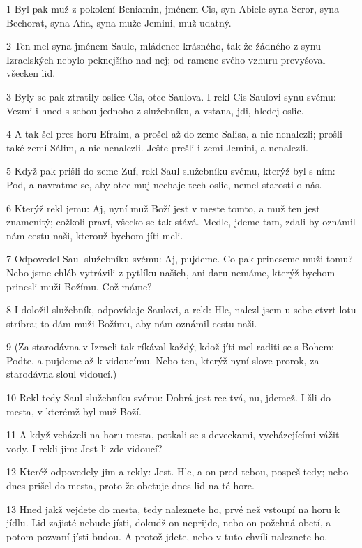 \par 1 Byl pak muž z pokolení Beniamin, jménem Cis, syn Abiele syna Seror, syna Bechorat, syna Afia, syna muže Jemini, muž udatný.
\par 2 Ten mel syna jménem Saule, mládence krásného, tak že žádného z synu Izraelských nebylo peknejšího nad nej; od ramene svého vzhuru prevyšoval všecken lid.
\par 3 Byly se pak ztratily oslice Cis, otce Saulova. I rekl Cis Saulovi synu svému: Vezmi i hned s sebou jednoho z služebníku, a vstana, jdi, hledej oslic.
\par 4 A tak šel pres horu Efraim, a prošel až do zeme Salisa, a nic nenalezli; prošli také zemi Sálim, a nic nenalezli. Ješte prešli i zemi Jemini, a nenalezli.
\par 5 Když pak prišli do zeme Zuf, rekl Saul služebníku svému, kterýž byl s ním: Pod, a navratme se, aby otec muj nechaje tech oslic, nemel starosti o nás.
\par 6 Kterýž rekl jemu: Aj, nyní muž Boží jest v meste tomto, a muž ten jest znamenitý; cožkoli praví, všecko se tak stává. Medle, jdeme tam, zdali by oznámil nám cestu naši, kterouž bychom jíti meli.
\par 7 Odpovedel Saul služebníku svému: Aj, pujdeme. Co pak prineseme muži tomu? Nebo jsme chléb vytrávili z pytlíku našich, ani daru nemáme, kterýž bychom prinesli muži Božímu. Což máme?
\par 8 I doložil služebník, odpovídaje Saulovi, a rekl: Hle, nalezl jsem u sebe ctvrt lotu stríbra; to dám muži Božímu, aby nám oznámil cestu naši.
\par 9 (Za starodávna v Izraeli tak ríkával každý, kdož jíti mel raditi se s Bohem: Podte, a pujdeme až k vidoucímu. Nebo ten, kterýž nyní slove prorok, za starodávna sloul vidoucí.)
\par 10 Rekl tedy Saul služebníku svému: Dobrá jest rec tvá, nu, jdemež. I šli do mesta, v kterémž byl muž Boží.
\par 11 A když vcházeli na horu mesta, potkali se s deveckami, vycházejícími vážit vody. I rekli jim: Jest-li zde vidoucí?
\par 12 Kteréž odpovedely jim a rekly: Jest. Hle, a on pred tebou, pospeš tedy; nebo dnes prišel do mesta, proto že obetuje dnes lid na té hore.
\par 13 Hned jakž vejdete do mesta, tedy naleznete ho, prvé než vstoupí na horu k jídlu. Lid zajisté nebude jísti, dokudž on neprijde, nebo on požehná obetí, a potom pozvaní jísti budou. A protož jdete, nebo v tuto chvíli naleznete ho.
